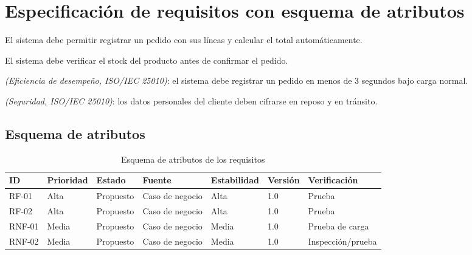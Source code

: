 \documentclass[11pt,a4paper]{article}
\begin{document}
\section{Especificación de requisitos con esquema de atributos}

\begin{description}[leftmargin=1.5cm]
  \item[RF-01:] El sistema debe permitir registrar un pedido con sus líneas y calcular el total
        automáticamente.
  \item[RF-02:] El sistema debe verificar el stock del producto antes de confirmar el pedido.
  \item[RNF-01:] \textit{(Eficiencia de desempeño, ISO/IEC 25010)}: el sistema debe registrar un
        pedido en menos de 3 segundos bajo carga normal.
  \item[RNF-02:] \textit{(Seguridad, ISO/IEC 25010)}: los datos personales del cliente deben
        cifrarse en reposo y en tránsito.
\end{description}

\subsection*{Esquema de atributos}
\begin{table}[h!]
\centering
\begin{tabular}{lllllll}
\toprule
\textbf{ID} & \textbf{Prioridad} & \textbf{Estado} & \textbf{Fuente} & \textbf{Estabilidad} & \textbf{Versión} & \textbf{Verificación} \\
\midrule
RF-01  & Alta  & Propuesto & Caso de negocio & Alta  & 1.0 & Prueba \\
RF-02  & Alta  & Propuesto & Caso de negocio & Alta  & 1.0 & Prueba \\
RNF-01 & Media & Propuesto & Caso de negocio & Media & 1.0 & Prueba de carga \\
RNF-02 & Media & Propuesto & Caso de negocio & Media & 1.0 & Inspección/prueba \\
\bottomrule
\end{tabular}
\caption{Esquema de atributos de los requisitos}
\end{table}

\end{document}
